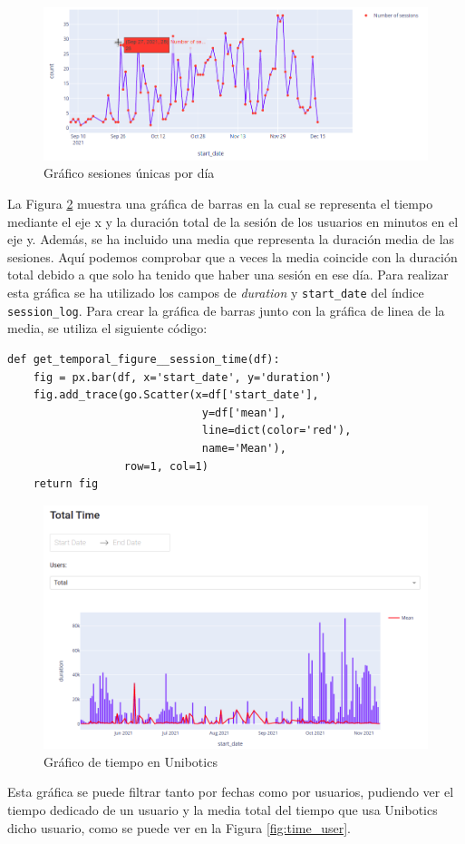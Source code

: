 \begin{figure}[H]
    \centering
    \includegraphics[width=16cm, keepaspectratio]{img/sesion_users.png}
    \caption{Gráfico sesiones únicas por día}
    \label{fig:sesion_users}
\end{figure}
La Figura \ref{fig:time} muestra una gráfica de barras en la cual se representa el tiempo mediante el eje x y la duración total de la sesión de los usuarios en minutos en el eje y. Además, se ha incluido una media que representa la duración media de las sesiones. Aquí podemos comprobar que a veces la media coincide con la duración total debido a que solo ha tenido que haber una sesión en ese día. Para realizar esta gráfica se ha utilizado los campos de \textit{duration} y \texttt{start\_date} del índice \texttt{session\_log}. Para crear la gráfica de barras junto con la gráfica de linea de la media, se utiliza el siguiente código:

\begin{verbatim}
def get_temporal_figure__session_time(df):
    fig = px.bar(df, x='start_date', y='duration')
    fig.add_trace(go.Scatter(x=df['start_date'], 
                              y=df['mean'], 
                              line=dict(color='red'), 
                              name='Mean'),
                  row=1, col=1)
    return fig
\end{verbatim}

\begin{figure}[H]
    \centering
    \includegraphics[width=16cm, keepaspectratio]{img/time.png}
    \caption{Gráfico de tiempo en Unibotics}
    \label{fig:time}
\end{figure}
Esta gráfica se puede filtrar tanto por fechas como por usuarios, pudiendo ver el tiempo dedicado de un usuario y la media total del tiempo que usa Unibotics dicho usuario, como se puede ver en la Figura \ref{fig:time_user}.

